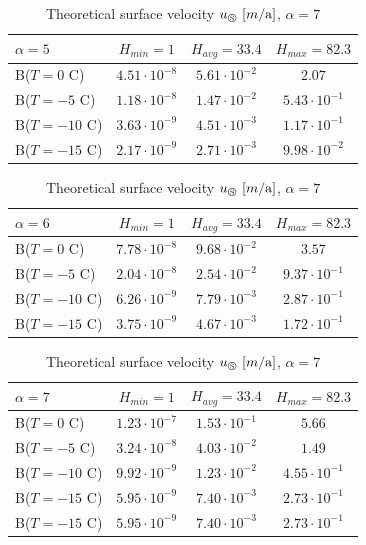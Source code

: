 \begin{table}[H]
    \centering
	\begin{tabular}{lccc}
	\toprule
	$\alpha=5$ & $H_{min} = 1$ & $H_{avg}=33.4$ & $H_{max} = 82.3$\\
	\midrule
	B($T=0$ C) & $4.51 \cdot 10^{-8}$ & $5.61 \cdot 10^{-2}$ & $2.07$ \\
	B($T=-5$ C) & $1.18 \cdot 10^{-8}$ & $1.47 \cdot 10^{-2}$ & $5.43 \cdot 10^{-1}$ \\
	B($T=-10$ C) & $3.63 \cdot 10^{-9}$ & $4.51 \cdot 10^{-3}$ & $1.17 \cdot 10^{-1}$ \\
	B($T=-15$ C) & $2.17 \cdot 10^{-9}$ & $2.71 \cdot 10^{-3}$ & $9.98 \cdot 10^{-2}$
	\end{tabular}
	\caption{Theoretical surface velocity $u_\circledS\,\left[m / \text{yr} \right]$, $\alpha = 5$}
	\label{GPS:tab:theorytable5}

	
	\begin{tabular}{lccc}
	\toprule
	$\alpha=6$  & $H_{min} = 1$ & $H_{avg}=33.4$ & $H_{max} = 82.3$ \\
	\midrule
	B($T=0$ C) & $7.78 \cdot 10^{-8}$ & $9.68 \cdot 10^{-2}$ & $3.57$ \\
	B($T=-5$ C) & $2.04 \cdot 10^{-8}$ & $2.54 \cdot 10^{-2}$ & $9.37 \cdot 10^{-1}$ \\
	B($T=-10$ C) & $6.26 \cdot 10^{-9}$ & $7.79 \cdot 10^{-3}$ & $2.87 \cdot 10^{-1}$ \\
	B($T=-15$ C) & $3.75 \cdot 10^{-9}$ & $4.67 \cdot 10^{-3}$ & $1.72 \cdot 10^{-1}$\\
	\end{tabular}
	\caption{Theoretical surface velocity $u_\circledS\,\left[m / \text{a} \right]$, $\alpha = 6$}
	\label{GPS:tab:theorytable6}
    
    	\begin{tabular}{lccc}
	\toprule
	$\alpha=7$  & $H_{min} = 1$ & $H_{avg}=33.4$ & $H_{max} = 82.3$ \\
	\midrule
	B($T=0$ C) & $1.23 \cdot 10^{-7}$ & $1.53 \cdot 10^{-1}$ & $5.66$ \\
	B($T=-5$ C) & $3.24 \cdot 10^{-8}$ & $4.03 \cdot 10^{-2}$ & $1.49$ \\
	B($T=-10$ C) & $9.92 \cdot 10^{-9}$ & $1.23 \cdot 10^{-2}$ & $4.55 \cdot 10^{-1}$ \\
	B($T=-15$ C) & $5.95 \cdot 10^{-9}$ & $7.40 \cdot 10^{-3}$ & $2.73 \cdot 10^{-1}$\\
	B($T=-15$ C) & $5.95 \cdot 10^{-9}$ & $7.40 \cdot 10^{-3}$ & $2.73 \cdot 10^{-1}$
	\end{tabular}
	\caption{Theoretical surface velocity $u_\circledS\,\left[m / \text{a} \right]$, $\alpha = 7$}
	\label{GPS:tab:theorytable7}
\end{table}

